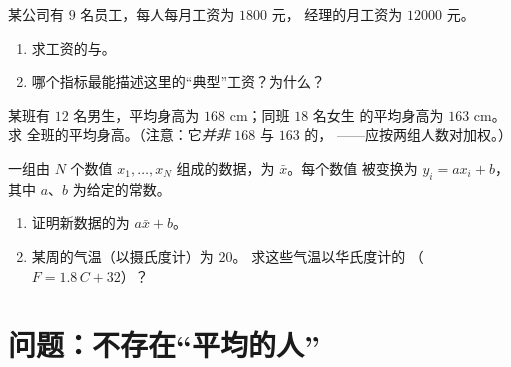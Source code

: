 \begin{exercise}[$\star\star$]\label{exo:g10:stats:7}
某公司有 $9$ 名员工，每人每月工资为 $1800$ 元，
经理的月工资为 $12000$ 元。
\begin{enumerate}
  \item 求工资的与。
  \item 哪个指标最能描述这里的“典型”工资？为什么？
\end{enumerate}
\end{exercise}

\begin{exercise}[$\star\star$]\label{exo:g10:stats:8}
某班有 $12$ 名男生，平均身高为 $168$ cm；同班 $18$ 名女生
的平均身高为 $163$ cm。求
全班的平均身高。（注意：它\emph{并非} $168$ 与 $163$ 的，
——应按两组人数对加权。）
\end{exercise}

\begin{exercise}[$\star\star\star$]\label{exo:g10:stats:9}
一组由 $N$ 个数值 $x_1, \dots, x_N$ 组成的数据，为 $\bar x$。每个数值
被变换为 $y_i = a x_i + b$，其中 $a$、$b$ 为给定的常数。
\begin{enumerate}
  \item 证明新数据的为 $a \bar x + b$。
  \item 某周的气温（以摄氏度计）为 $20$。
        求这些气温以华氏度计的
        （$F = 1.8\,C + 32$）？
\end{enumerate}
\end{exercise}

\section{问题：不存在“平均的人”}

